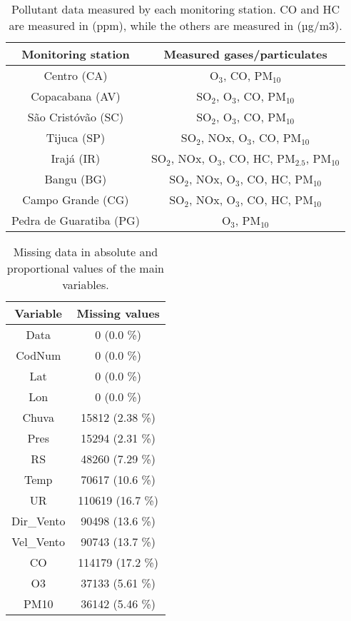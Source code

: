 \begin{table*}[t]
    \centering
    \begin{tabular}{|c|c|}
    \hline
    \textbf{Monitoring station}        & \textbf{Measured gases/particulates}              \\ \hline
    Centro (CA)             & O$_3$, CO, PM$_{10}$                              \\ \hline
    Copacabana (AV)         & SO$_2$, O$_3$, CO, PM$_{10}$                      \\ \hline
    São Cristóvão (SC)      & SO$_2$, O$_3$, CO, PM$_{10}$                      \\ \hline
    Tijuca (SP)             & SO$_2$, NOx, O$_3$, CO, PM$_{10}$                 \\ \hline
    Irajá (IR)              & SO$_2$, NOx, O$_3$, CO, HC, PM$_{2.5}$, PM$_{10}$ \\ \hline
    Bangu (BG)              & SO$_2$, NOx, O$_3$, CO, HC, PM$_{10}$             \\ \hline
    Campo Grande (CG)       & SO$_2$, NOx, O$_3$, CO, HC, PM$_{10}$             \\ \hline
    Pedra de Guaratiba (PG) & O$_3$, PM$_{10}$                                  \\ \hline
    \end{tabular}
    \caption{Pollutant data measured by each monitoring station. CO and HC are measured in (ppm), while the others are measured in (µg/m3).}
    \label{tab:pollutants-measured}
\end{table*}

\begin{table}
    \centering
    \begin{tabular}{|c|c|}
        \hline
        {\bf Variable} & {\bf Missing values} \\\hline
        Data      &        0 (0.0 \%) \\\hline
        CodNum    &        0 (0.0 \%) \\\hline
        Lat       &        0 (0.0 \%) \\\hline
        Lon       &        0 (0.0 \%) \\\hline
        Chuva     &   15812 (2.38 \%) \\\hline
        Pres      &   15294 (2.31 \%) \\\hline
        RS        &   48260 (7.29 \%) \\\hline
        Temp      &   70617 (10.6 \%) \\\hline
        UR        &  110619 (16.7 \%) \\\hline
        Dir\_Vento &   90498 (13.6 \%) \\\hline
        Vel\_Vento &   90743 (13.7 \%) \\\hline
        CO        &  114179 (17.2 \%) \\\hline
        O3        &   37133 (5.61 \%) \\\hline
        PM10      &   36142 (5.46 \%) \\\hline
    \end{tabular}
    \caption{Missing data in absolute and proportional values of the main variables.}
    \label{tab:missing-values}    
\end{table}

